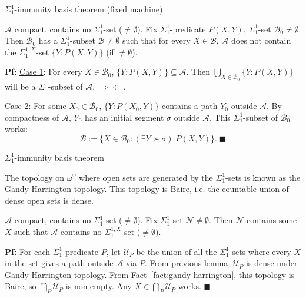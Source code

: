 \begin{frame}{$\Sigma_1^{1}$-immunity basis theorem (fixed machine)}
  \begin{lemma}
    $\mathcal{A}$ compact, contains no $\Sigma_1^{1}$-set
    ($\neq\emptyset$). Fix $\Sigma_1^{1}$-predicate $P(X,Y)$,
    $\Sigma_1^{1}$-set $\mathcal{B}_0\neq\emptyset$. Then
    $\mathcal{B}_0$ has a $\Sigma_1^{1}$-subset
    $\mathcal{B}\neq\emptyset$ such that for every $X\in\mathcal{B}$,
    $\mathcal{A}$ does not contain the $\Sigma_1^{1,X}$-set
    $\{Y:P(X,Y)\}$ (if $\neq\emptyset$).
  \end{lemma}

  \vspace{1em}
  \textbf{Pf:} \underline{Case 1}: For every $X\in\mathcal{B}_0$,
  $\{Y:P(X,Y)\}\subseteq\mathcal{A}$. Then $\bigcup_{X\in\mathcal{B}_0}
  \{Y:P(X,Y)\}$ will be a $\Sigma_1^{1}$-subset of $\mathcal{A}$,
  $\Rightarrow\Leftarrow$.

  \vspace{1em}
  \underline{Case 2}: For some $X_0\in\mathcal{B}_0$, $\{Y:P(X_0,Y)\}$
  contains a path $Y_0$ outside $\mathcal{A}$. By compactness of
  $\mathcal{A}$, $Y_0$ has an initial segment $\sigma$ outside
  $\mathcal{A}$. This $\Sigma_1^{1}$-subset of $\mathcal{B}_0$ works:
  \[\mathcal{B}:= \{X\in\mathcal{B}_0: (\exists Y\succ\sigma)\; P(X,Y)\}.\;
  \blacksquare\]
\end{frame}

\begin{frame}{$\Sigma_1^{1}$-immunity basis theorem}
  \begin{fact}
    \label{fact:gandy-harrington}
    The topology on $\omega^\omega$ where open sets are generated by the
    $\Sigma_1^{1}$-sets is known as the Gandy-Harrington topology.  This
    topology is Baire, i.e. the countable union of dense open sets is
    dense.
  \end{fact}

  \begin{thm}
    $\mathcal{A}$ compact, contains no $\Sigma_1^{1}$-set
    ($\neq\emptyset$). Fix $\Sigma_1^{1}$-set
    $\mathcal{N}\neq\emptyset$. Then $\mathcal{N}$ contains some $X$ such
    that $\mathcal{A}$ contains no $\Sigma_1^{1,X}$-set ($\neq\emptyset$).
  \end{thm}

  \vspace{0.5em}
  \textbf{Pf:} For each $\Sigma_1^{1}$-predicate $P$, let $\mathcal{U}_P$
  be the union of all the $\Sigma_1^{1}$-sets where every $X$ in the set
  gives a path outside $\mathcal{A}$ via $P$. From previous lemma,
  $\mathcal{U}_P$ is dense under Gandy-Harrington topology. From
  Fact~\ref{fact:gandy-harrington}, this topology is Baire, so
  $\bigcap_P\mathcal{U}_P$ is non-empty. Any $X\in\bigcap_P\mathcal{U}_P$
  works. $\blacksquare$
\end{frame}


